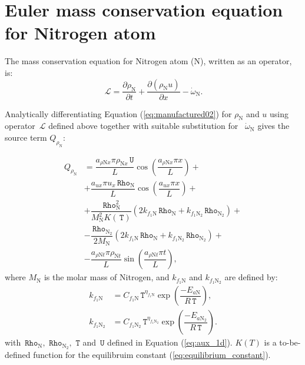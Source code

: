 \documentclass[10pt]{article}
\newcommand{\Diff}[2] {\dfrac{\partial( #1)}{\partial #2}}
\newcommand{\diff}[2] {\dfrac{\partial #1 }{\partial #2}}
\newcommand{\Lo}{\,\mathcal{L}}
\newcommand{\Rho}{\,\mathtt{Rho}}
\newcommand{\T}{\,\mathtt{T}}
\newcommand{\U}{\,\mathtt{U}}
\begin{document}
\section{Euler mass conservation equation for Nitrogen atom}

The mass conservation equation for Nitrogen atom (N), written as an operator, is:
\begin{equation*}
 \label{eq:euler1d_11}
\Lo =  \diff{\rho_\text{N} }{t} + \Diff{\rho_\text{N} u}{x} - \dot{\omega}_{\text{N}}.
\end{equation*}

Analytically differentiating Equation (\ref{eq:manufactured02}) for $\rho_{\text{N}}$  and $u$ using operator $\Lo$ defined above together with suitable substitution for ~$\dot{\omega}_\text{N}$ gives the source term $Q_{\rho_{\text{N}}}$:


\begin{equation}
\begin{split}
Q_{\rho_\text{N}}&= \dfrac{a_{ \rho \text{N} x} \pi \rho_{\text{N}x} \U }{L}\cos\left(\dfrac{a_{ \rho \text{N} x} \pi x}{L}\right)+\\
&+\dfrac{a_{ux} \pi u_x \Rho_\text{N} }{L}\cos\left(\dfrac{a_{ux} \pi x}{L}\right)+\\
&+ \dfrac{\Rho_\text{N}^2}{M_{\text{N}}^2 K(\T)}\left(2 k_{f_1 \text{N}} \Rho_\text{N}+k_{f_1 \text{N}_2} \Rho_{\text{N}_2}\right)  +\\
&-\dfrac{\Rho_{\text{N}_2}}{2M_{\text{N}}}\left(2 k_{f_1 \text{N}} \Rho_\text{N}+k_{f_1 \text{N}_2} \Rho_{\text{N}_2}\right) +\\
&- \dfrac{a_{ \rho \text{N} t} \pi \rho_{\text{N} t} }{L} \sin\left(\dfrac{a_{ \rho \text{N} t} \pi t}{L}\right),
\end{split}
\end{equation}
where $M_{\text{N}}$ is the molar mass of Nitrogen, and $k_{f_1 \text{N}}$ and $k_{f_1 \text{N}_2}$ are defined by:
\begin{equation}
 \begin{split}\label{eq:forward_rates}
k_{f_1 \text{N}} &= C_{f_1 \text{N}} \T^{\eta_{f_1 \text{N}}} \exp\left(\dfrac{-E_{a\text{N}}}{R \T}\right),\\
k_{f_1 \text{N}_2} &= C_{f_1 \text{N}_2} \T^{\eta_{f_1 \text{N}_2}} \exp\left(\dfrac{-E_{a\text{N}_2}}{R \T}\right).
 \end{split}
\end{equation}
with $\Rho_{\text{N}},\,\Rho_{\text{N}_2},\, \T$ and $\U$ defined in Equation (\ref{eq:aux_1d}). $K(T)$ is a to-be-defined function for the equilibruim constant (\ref{eq:equilibrium_constant}).
\end{document}
